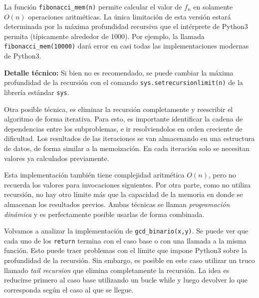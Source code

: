 \documentclass[a4paper, 11pt]{article}
\theoremstyle{plain}
\theoremstyle{definition}
\begin{document}
\bigskip



\bigskip

La función \texttt{fibonacci\_mem(n)} permite calcular el valor de $f_n$ en
solamente $O(n)$ operaciones aritméticas. La única limitación de esta versión
estará determinada por la máxima profundidad recursiva que el intérprete de
Python3 permita (típicamente alrededor de 1000). Por ejemplo, la llamada 
\texttt{fibonacci\_mem(10000)} dará error en casi todas las implementaciones
modernas de Python3.

\bigskip

{\bf Detalle técnico:} Si bien no es recomendado, se puede cambiar la máxima
profundidad de la recursión con el comando \texttt{sys.setrecursionlimit(n)}
de la librería estándar \texttt{sys}.

\bigskip

Otra posible técnica, es eliminar la recursión completamente y reescribir el
algoritmo de forma iterativa. Para esto, es importante identificar la cadena
de dependencias entre los subproblemas, e ir resolviendolos en orden creciente
de dificultad. Los resultados de las iteraciones se van almacenando en una
estructura de datos, de forma similar a la memoización. En cada iteración
solo se necesitan valores ya calculados previamente.

\bigskip



\bigskip

Esta implementación también tiene complejidad aritmética $O(n)$, pero no
recuerda los valores para invocaciones siguientes. Por otra parte, como no
utiliza recursión, no hay otro límite más que la capacidad de la memoria en
donde se almacenan los resultados previos. Ambas técnicas se llaman
\emph{programación dinámica} y es perfectamente posible usarlas de
forma combinada.

\bigskip

Volvamos a analizar la implementación de \texttt{gcd\_binario(x,y)}. Se puede
ver que cada uno de los \texttt{return} termina con el caso base o con una
llamada a la misma función. Esto puede traer problemas con el límite que impone
Python3 sobre la profundidad de la recursión. Sin embargo, es posible en este
caso utilizar un truco llamado \emph{tail recursion} que elimina completamente
la recursión. La idea es reducirse primero al caso base utilizando un bucle
while y luego devolver lo que corresponda según el caso al que se llegue.
\end{document}
